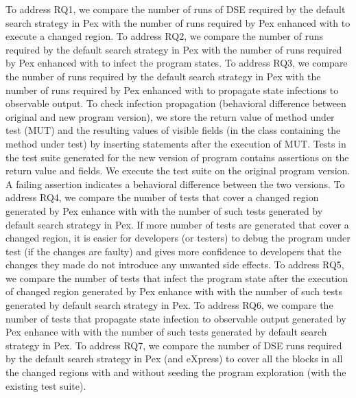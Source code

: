  To address RQ1, we compare the number of runs of DSE required by the default search strategy in Pex with the number of runs required by Pex enhanced with  to execute a changed region. To address RQ2, we compare the number of runs required by the default search strategy in Pex with the number of runs required by Pex enhanced with  to infect the program states. To address RQ3, we compare the number of runs required by the default search strategy in Pex with the number of runs required by Pex enhanced with   to propagate state infections to observable output. To check infection propagation (behavioral difference between original and new program version), we store the return value of method under test (MUT) and the resulting values of visible fields (in the class containing the method under test) by inserting  statements after the execution of MUT. Tests in the test suite generated for the new version of program contains assertions on the return value and fields. We execute the test suite on the original program version. A failing assertion indicates a behavioral difference between the two versions.  To address RQ4, we compare the number of tests that cover a changed region generated by Pex enhance with  with the number of such tests generated by default search strategy in Pex. If more number of tests are generated that cover a changed region, it is easier for developers (or testers) to debug the program under test (if the changes are faulty) and gives more confidence to developers that the changes they made do not introduce any unwanted side effects.
To address RQ5, we compare the number of tests that infect the program state after the execution of changed region generated by Pex enhance with  with the number of such tests generated by default search strategy in Pex. To address RQ6, we compare the number of tests that propagate state infection to observable output generated by Pex enhance with  with the number of such tests generated by default search strategy in Pex. 
To address RQ7, we compare the number of DSE runs required by the default search strategy in Pex (and eXpress) to cover all the blocks in all the changed regions with and without seeding the program exploration (with the existing test suite).


